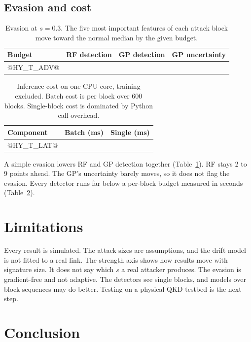 \documentclass[conference,10pt]{IEEEtran}
\begin{document}
\subsection{Evasion and cost}

\begin{table}[t]
  \centering
  \caption{Evasion at $s=0.3$. The five most important features of each attack block move toward the normal median by the given budget.}
  \label{tab:adv}
  \footnotesize
  \begin{tabular}{lccc}
    \toprule
    Budget & RF detection & GP detection & GP uncertainty \\
    \midrule
@HY_T_ADV@
    \bottomrule
  \end{tabular}
\end{table}

\begin{table}[t]
  \centering
  \caption{Inference cost on one CPU core, training excluded. Batch cost is per block over 600 blocks. Single-block cost is dominated by Python call overhead.}
  \label{tab:latency}
  \footnotesize
  \begin{tabular}{lcc}
    \toprule
    Component & Batch (ms) & Single (ms) \\
    \midrule
@HY_T_LAT@
    \bottomrule
  \end{tabular}
\end{table}

A simple evasion lowers RF and GP detection together (Table~\ref{tab:adv}). RF
stays 2 to 9 points ahead. The GP's uncertainty barely moves, so it does not flag
the evasion. Every detector runs far below a per-block budget measured in seconds
(Table~\ref{tab:latency}).

\section{Limitations}

Every result is simulated. The attack sizes are assumptions, and the drift model
is not fitted to a real link. The strength axis shows how results move with
signature size. It does not say which $s$ a real attacker produces. The evasion is
gradient-free and not adaptive. The detectors see single blocks, and models over
block sequences may do better. Testing on a physical QKD testbed is the next step.

\section{Conclusion}
\end{document}

